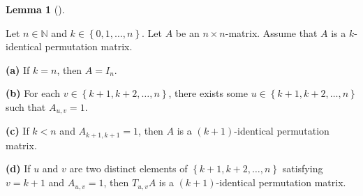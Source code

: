 \documentclass[numbers=enddot,12pt,final,onecolumn,notitlepage]{scrartcl}%
\theoremstyle{definition}
\newtheorem{lem}[theo]{Lemma}
\newenvironment{lemma}[1][]
{\begin{lem}[#1]\begin{leftbar}}
{\end{leftbar}\end{lem}}
\begin{document}
\begin{lemma}
\label{lem.permat.Tuv.k-id.1}Let $n\in\mathbb{N}$ and $k\in\left\{
0,1,\ldots,n\right\}  $. Let $A$ be an $n\times n$-matrix. Assume that $A$ is
a $k$-identical permutation matrix.

\textbf{(a)} If $k=n$, then $A=I_{n}$.

\textbf{(b)} For each $v\in\left\{  k+1,k+2,\ldots,n\right\}  $, there exists
some $u\in\left\{  k+1,k+2,\ldots,n\right\}  $ such that $A_{u,v}=1$.

\textbf{(c)} If $k<n$ and $A_{k+1,k+1}=1$, then $A$ is a $\left(  k+1\right)
$-identical permutation matrix.

\textbf{(d)} If $u$ and $v$ are two distinct elements of $\left\{
k+1,k+2,\ldots,n\right\}  $ satisfying $v=k+1$ and $A_{u,v}=1$, then
$T_{u,v}A$ is a $\left(  k+1\right)  $-identical permutation matrix.
\end{lemma}
\end{document}
